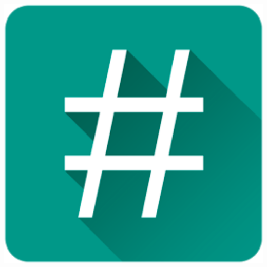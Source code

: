 \documentclass[aspectratio=1610, ]{beamer}%
\begin{document}
\begin{frame}[t]
\begin{columns}
\begin{column}{0.25\linewidth}
        \includegraphics[width=\linewidth]{superSU.png}
      \end{column}
    \end{columns}
  \end{frame}
\end{document}
